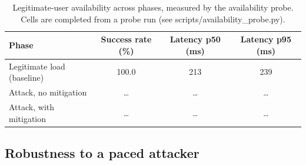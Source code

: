 \documentclass[a4paper,fleqn]{cas-dc}
\begin{document}
\begin{table}[tp]
\centering
\small
\caption{Legitimate-user availability across phases, measured by the availability probe. Cells are completed from a probe run (see scripts/availability\_probe.py).}
\label{tab:availability}
\begin{tabular}{@{}lccc@{}}
\toprule
Phase & Success rate (\%) & Latency p50 (ms) & Latency p95 (ms) \\
\midrule
Legitimate load (baseline) & 100.0 & 213 & 239 \\
Attack, no mitigation      & \dots & \dots & \dots \\
Attack, with mitigation    & \dots & \dots & \dots \\
\bottomrule
\end{tabular}
\end{table}


\subsection{Robustness to a paced attacker}\label{sec:eval-paced}
\end{document}
